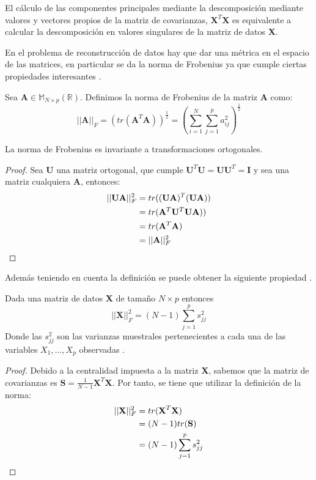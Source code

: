 \begin{coro}
El cálculo de las componentes principales mediante la descomposición mediante valores y vectores propios de la matriz de covarianzas, $\mathbf{X}^T\mathbf{X}$ es equivalente a calcular la descomposición en valores singulares de la matriz de datos $\mathbf{X}$. 
\end{coro}
\noindent En el problema de reconstrucción de datos hay que dar una métrica en el espacio de las matrices, en particular se da la norma de Frobenius ya que cumple ciertas propiedades interesantes \cite{Golub 1987}.

\begin{defi}
Sea $\textbf{A}\in \mathbb{M}_{N\times p}(\mathbb{R})$. Definimos la norma de Frobenius de la matriz \textbf{A} como:
\begin{equation}
||\textbf{A}||_F=(tr(\textbf{A}^T \textbf{A}))^{\frac{1}{2}}=\left(\sum_{i=1}^{N}\sum _{j=1}^{p}a_{ij}^2\right)^{\frac{1}{2}}
\end{equation}
\end{defi}

\begin{propo}
La norma de Frobenius es invariante a transformaciones ortogonales.
\begin{proof}
Sea $\mathbf{U}$ una matriz ortogonal, que cumple $\mathbf{U}^T \mathbf{U}=\mathbf{U} \mathbf{U}^T=\textbf{I}$ y  sea una matriz cualquiera $\mathbf{A}$, entonces:
\begin{align*}
||\mathbf{U}  \mathbf{A}||_F^2&=tr((\mathbf{U} \mathbf{A})^T(\mathbf{U} \mathbf{A}))\\
&=tr(\mathbf{A}^T \mathbf{U}^T \mathbf{U} \mathbf{A}))\\
&=tr(\mathbf{A}^T \mathbf{A})\\
&=||\mathbf{A}||_F^2\qedhere
\end{align*}
\end{proof}
\end{propo}

\noindent Además teniendo en cuenta la definición se puede obtener la siguiente propiedad \cite{Chatfield 1989}.

\begin{propo}
Dada una matriz de datos \textbf{X} de tamaño $N\times p$ entonces
\begin{equation}
||\textbf{X}||_F^2=(N-1)\sum_{j=1}^p s_{jj}^2
\end{equation}
Donde las $s_{jj}^2$ son las varianzas muestrales pertenecientes a cada una de las variables $X_1,\ldots,X_p$ observadas .
\begin{proof}
Debido a la centralidad impuesta a la matriz \textbf{X}, sabemos que la matriz de covarianzas es $\textbf{S}=\frac{1}{N-1}\textbf{X}^T \textbf{X}$. Por tanto, se tiene que utilizar la definición de la norma:
\begin{align*}
||\textbf{X}||_F^2 &= tr(\textbf{X}^T\textbf{X})\\
&= (N-1) tr(\textbf{S})\\
&= (N-1) \sum_{j=1}^p s_{jj}^2 \qedhere
\end{align*}
\end{proof}
\end{propo}

